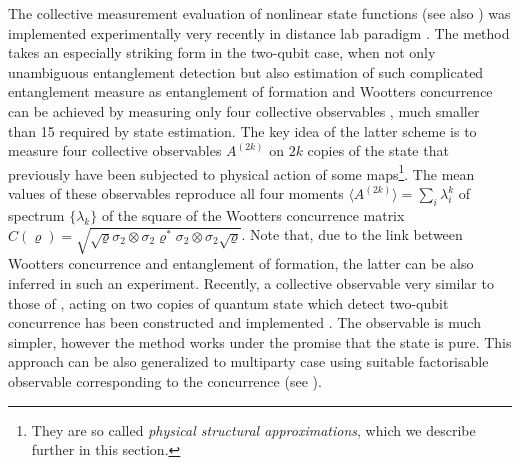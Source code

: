 \documentclass[rmp,12pt,preprint]{revtex4-2}
\begin{document}
The  collective measurement evaluation of nonlinear state functions
\cite{Filip,Estimator} (see also \cite{Witnesses,Fiurasek}) was
implemented experimentally very recently in distance lab paradigm \cite{NonlinExp}. The
method takes an especially striking form in the two-qubit case, when
not only unambiguous entanglement detection \cite{PHAE} but also
estimation of such complicated entanglement measure as entanglement
of formation and Wootters concurrence can be achieved by measuring
only four collective observables \cite{PHPRL}, much smaller than 15
required by state estimation. The key idea of the latter scheme is
to measure four collective observables $A^{(2k)}$ on $2k$ copies of
the state that previously have been subjected to physical action of
some maps\footnote{They are so called {\it physical structural
approximations}, which we describe further in this section.}. The
mean values of these observables reproduce all four moments $\langle
A^{(2k)}\rangle  = \sum_{i}\lambda_{i}^{k}$ of spectrum $\{
\lambda_{k} \}$ of the square of the Wootters concurrence matrix
$\hat{C}(\varrho)= \sqrt{\sqrt{\varrho} \sigma_{2}\otimes
\sigma_{2}\varrho^*\sigma_{2}\otimes \sigma_{2}\sqrt{\varrho}}$.
Note that, due to the link \cite{Wootters-conc} between Wootters
concurrence and entanglement of formation, the latter can be also
inferred in such an experiment.
Recently, a collective observable very similar to those  of
\cite{Witnesses}, acting on two copies of quantum state  which
detect two-qubit concurrence has been constructed and implemented
\cite{NatureConcurrence}. The observable is much simpler, however
the method works under the promise that the state is pure.
This approach can be also generalized to multiparty case using suitable
factorisable observable corresponding to the concurrence (see
\cite{AolitaMintert}).
\end{document}

